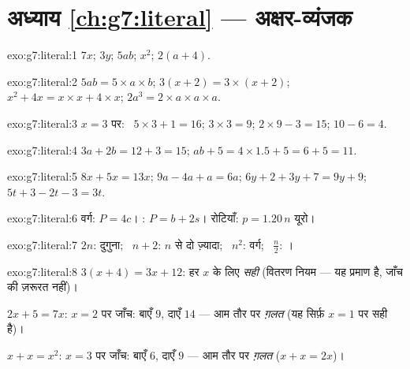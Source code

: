 \section*{अध्याय \ref{ch:g7:literal} --- अक्षर-व्यंजक}

\begin{solution}{exo:g7:literal:1}
$7x$; \quad $3y$; \quad $5ab$; \quad $x^2$; \quad $2(a + 4)$.
\end{solution}

\begin{solution}{exo:g7:literal:2}
$5ab = 5 \times a \times b$; \quad
$3(x+2) = 3 \times (x + 2)$; \quad
$x^2 + 4x = x \times x + 4 \times x$; \quad
$2a^3 = 2 \times a \times a \times a$.
\end{solution}

\begin{solution}{exo:g7:literal:3}
$x = 3$ पर: \ $5 \times 3 + 1 = 16$; \quad $3 \times 3 = 9$; \quad
$2 \times 9 - 3 = 15$; \quad $10 - 6 = 4$.
\end{solution}

\begin{solution}{exo:g7:literal:4}
$3a + 2b = 12 + 3 = 15$; \qquad
$ab + 5 = 4 \times 1.5 + 5 = 6 + 5 = 11$.
\end{solution}

\begin{solution}{exo:g7:literal:5}
$8x + 5x = 13x$; \quad
$9a - 4a + a = 6a$; \quad
$6y + 2 + 3y + 7 = 9y + 9$; \quad
$5t + 3 - 2t - 3 = 3t$.
\end{solution}

\begin{solution}{exo:g7:literal:6}
वर्ग: $P = 4c$। : $P = b + 2s$। रोटियाँ:
$p = 1.20\,n$ यूरो।
\end{solution}

\begin{solution}{exo:g7:literal:7}
$2n$: दुगुना; \ $n + 2$: $n$ से दो ज़्यादा; \ $n^2$: वर्ग;
\ $\frac n2$: ।
\end{solution}

\begin{solution}{exo:g7:literal:8}
$3(x+4) = 3x + 12$: हर $x$ के लिए \emph{सही} (वितरण नियम --- यह
प्रमाण है, जाँच की ज़रूरत नहीं)।

$2x + 5 = 7x$: $x = 2$ पर जाँच: बाएँ $9$, दाएँ $14$ --- आम तौर पर
\emph{ग़लत} (यह सिर्फ़ $x = 1$ पर सही है)।

$x + x = x^2$: $x = 3$ पर जाँच: बाएँ $6$, दाएँ $9$ --- आम तौर पर
\emph{ग़लत} ($x + x = 2x$)।
\end{solution}

